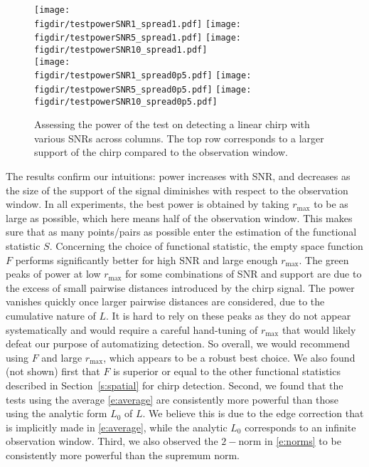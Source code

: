 \begin{figure}
\texttt{[image: \\figdir/testpowerSNR1\_spread1.pdf]}
\texttt{[image: \\figdir/testpowerSNR5\_spread1.pdf]}
\texttt{[image: \\figdir/testpowerSNR10\_spread1.pdf]}\\
\texttt{[image: \\figdir/testpowerSNR1\_spread0p5.pdf]}
\texttt{[image: \\figdir/testpowerSNR5\_spread0p5.pdf]}
\texttt{[image: \\figdir/testpowerSNR10\_spread0p5.pdf]}

\caption{
Assessing the power of the test on detecting a linear chirp with various SNRs
across columns. The top row corresponds to a larger support of the chirp
compared to the observation window.
\label{f:testPower}
}
\end{figure} 

The results confirm our intuitions: power increases with SNR, and decreases as
the size of the support of the signal diminishes with respect to the observation
window. In all experiments, the best power is obtained by taking $r_{\max}$ to
be as large as possible, which here means half of the observation window. This
makes sure that as many points/pairs as possible enter the estimation of the functional
statistic $S$. Concerning the choice of functional statistic, the empty space
function $F$ performs significantly better for high SNR and large enough
$r_{\max}$. The green peaks of power at low $r_{\max}$ for some combinations of
SNR and support are due to the excess of small pairwise distances introduced by
the chirp signal. The power vanishes quickly once larger pairwise distances are
considered, due to the cumulative nature of $L$. It is hard to rely on these
peaks as they do not appear systematically and would require a careful hand-tuning of
$r_{\max}$ that would likely defeat our purpose of automatizing detection. So overall, we would recommend using
$F$ and large $r_{\max}$, which appears to be a robust best choice. We also
found (not shown) first that $F$ is superior or equal to the other
functional statistics described in Section~\ref{s:spatial} for chirp detection. Second, we found that the tests using the average \eqref{e:average}
are consistently more powerful than those using the analytic form $L_0$ of
$L$. We believe this is due to the edge correction that is implicitly made in
\eqref{e:average}, while the analytic $L_0$ corresponds to an infinite
observation window. Third, we also observed the $2-$norm in \eqref{e:norms} to
be consistently more powerful than the supremum norm.

